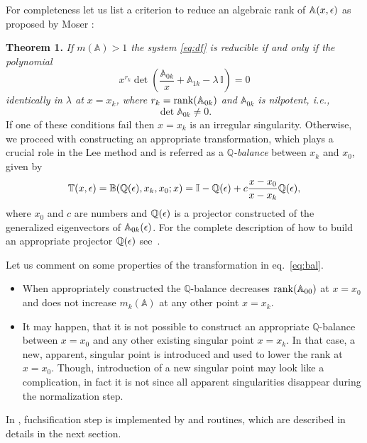 \documentclass[12pt,a4paper]{article}
\def\M#1{\mathbb{#1}} %
\begin{document}
For completeness let us list a criterion to reduce an algebraic rank of $\M A(x,\eps)$ as proposed by Moser \cite{Mos59}:

\textbf{Theorem 1.}
{\em If $m(\M A) > 1$ the system \eqref{eq:df} is reducible if and only if the polynomial}
\begin{equation}
\label{eq:red_cond}
  x^{r_k} \det\left(\frac{\M A_{0k}}{x} + \M A_{1k} - \lambda \,\M I\right) = 0
\end{equation}
{\em identically in $\lambda$ at $x=x_k$, where $r_k=\rank(\M A_{0k})$ and $\M A_{0k}$ is nilpotent, i.e.,}
\begin{equation}
  \det \M A_{0k} \ne 0.
\end{equation}
If one of these conditions fail then $x=x_k$ is an irregular singularity.
Otherwise, we proceed with constructing an appropriate transformation, which plays a crucial role in the Lee method and is referred as a {\em $\M Q$-balance} between $x_k$ and $x_0$, given by
\begin{equation}
  \label{eq:bal}
  \M T(x,\eps) = \M B(\M Q(\eps), x_k, x_0; x) = \M I - \M Q(\eps) + c \frac{x-x_0}{x-x_k} \M Q(\eps),
\end{equation}
where $x_0$ and $c$ are numbers and $\M Q(\eps)$ is a projector constructed of the generalized eigenvectors of $\M A_{0k}(\eps)$.
For the complete description of how to build an appropriate projector $\M Q(\eps)$ see~\cite[p.~9]{Lee15}.

Let us comment on some properties of the transformation in eq.~\eqref{eq:bal}.
\begin{itemize}
  \item When appropriately constructed the $\M Q$-balance decreases $\rank(\M A_{00})$ at $x=x_0$ and does not increase $m_k(\M A)$ at any other point $x=x_k$.
  \item It may happen, that it is not possible to construct an appropriate $\M Q$-balance between $x=x_0$ and any other existing singular point $x=x_k$.
        In that case, a new, apparent, singular point is introduced and used to lower the rank at $x=x_0$.
        Though, introduction of a new singular point may look like a complication, in fact it is not since all apparent singularities disappear during the normalization step.
\end{itemize}

In \fuchsia, fuchsification step is implemented by  and  routines, which are described in details in the next section.
\end{document}
